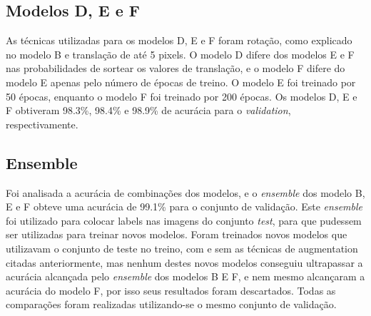 \documentclass[conference]{IEEEtran}
\begin{document}
\subsection{Modelos D, E e F}
	As técnicas utilizadas para os modelos D, E e F foram rotação, como explicado no modelo B e translação de até 5 pixels. O modelo D difere dos modelos E e F nas probabilidades de sortear os valores de translação, e o modelo F difere do modelo E apenas pelo número de épocas de treino. O modelo E foi treinado por 50 épocas, enquanto o modelo F foi treinado por 200 épocas. Os modelos D, E e F obtiveram 98.3\%, 98.4\% e 98.9\% de acurácia para o \textit{validation}, respectivamente.

\subsection{Ensemble}
	Foi analisada a acurácia de combinações dos modelos, e o \textit{ensemble} dos modelo B, E e F obteve uma acurácia de 99.1\% para o conjunto de validação. Este \textit{ensemble} foi utilizado para colocar labels nas imagens do conjunto \textit{test}, para que pudessem ser utilizadas para treinar novos modelos. Foram treinados novos modelos que utilizavam o conjunto de teste no treino, com e sem as técnicas de augmentation citadas anteriormente, mas nenhum destes novos modelos conseguiu ultrapassar a acurácia alcançada pelo \textit{ensemble} dos modelos B E F, e nem mesmo alcançaram a acurácia do modelo F, por isso seus resultados foram descartados. Todas as comparações foram realizadas utilizando-se o mesmo conjunto de validação.
\end{document}
